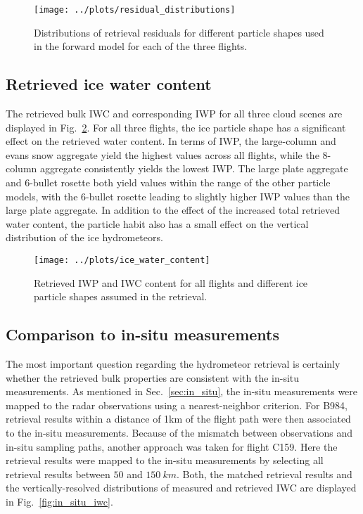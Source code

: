 \documentclass[journal abbreviation, manuscript]{copernicus}
\begin{document}
\begin{figure}[!hbpt]
  \centering
  \texttt{[image: ../plots/residual\_distributions]}
  \caption{Distributions of retrieval residuals for different particle
    shapes used in the forward model for each of the three flights.}
  \label{fig:residuals_box}
\end{figure}

\subsection{Retrieved ice water content}

The retrieved bulk IWC and corresponding IWP for all three cloud scenes are
displayed in Fig.~\ref{fig:ice_water_content}. For all three flights, the ice
particle shape has a significant effect on the retrieved water content. In terms
of IWP, the large-column and evans snow aggregate yield the highest values
across all flights, while the 8-column aggregate consistently yields the lowest
IWP. The large plate aggregate and 6-bullet rosette both yield values within the
range of the other particle models, with the 6-bullet rosette leading to
slightly higher IWP values than the large plate aggregate. In addition to the
effect of the increased total retrieved water content, the particle habit also
has a small effect on the vertical distribution of the ice hydrometeors.


\begin{figure}[!hbpt]
  \centering
  \texttt{[image: ../plots/ice\_water\_content]}
  \caption{Retrieved IWP and IWC content for all flights and
    different ice particle shapes assumed in the retrieval.}
  \label{fig:ice_water_content}
\end{figure}

\subsection{Comparison to in-situ measurements}

The most important question regarding the hydrometeor retrieval is certainly
whether the retrieved bulk properties are consistent with the in-situ
measurements. As mentioned in Sec.~\ref{sec:in_situ}, the in-situ measurements
were mapped to the radar observations using a nearest-neighbor criterion. For
B984, retrieval results within a distance of 1km of the flight path were then
associated to the in-situ measurements. Because of the mismatch between
observations and in-situ sampling paths, another approach was taken for flight
C159. Here the retrieval results were mapped to the in-situ measurements by
selecting all retrieval results between $50$ and $150\ \unit{km}$. Both,
the matched retrieval results and the vertically-resolved distributions of
measured and retrieved IWC are displayed in Fig.~\ref{fig:in_situ_iwc}.
\end{document}
